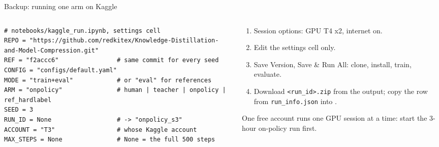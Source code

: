 \begin{frame}[fragile]{Backup: running one arm on Kaggle\hfill{}}
  \begin{columns}[T]
    \begin{column}{0.58\textwidth}
\begin{lstlisting}[basicstyle=\ttfamily\tiny]
# notebooks/kaggle_run.ipynb, settings cell
REPO = "https://github.com/redkitex/Knowledge-Distillation-and-Model-Compression.git"
REF = "f2accc6"                # same commit for every seed
CONFIG = "configs/default.yaml"
MODE = "train+eval"            # or "eval" for references
ARM = "onpolicy"               # human | teacher | onpolicy | ref_hardlabel
SEED = 3
RUN_ID = None                  # -> "onpolicy_s3"
ACCOUNT = "T3"                 # whose Kaggle account
MAX_STEPS = None               # None = the full 500 steps
\end{lstlisting}
    \end{column}
    \begin{column}{0.39\textwidth}
      \footnotesize
      \begin{enumerate}
        \item Session options: GPU T4 x2, internet on.
        \item Edit the settings cell only.
        \item Save Version, Save \& Run All: clone, install, train, evaluate.
        \item Download \texttt{<run\_id>.zip} from the output; copy the row
              from \texttt{run\_info.json} into .
      \end{enumerate}
      \vspace{0.1cm}
      {\scriptsize\color{kdgray} One free account runs one GPU session at a time:
      start the 3-hour on-policy run first.}
    \end{column}
  \end{columns}
\end{frame}

